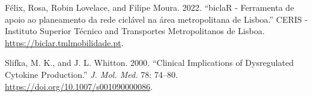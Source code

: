 \documentclass[runningheads]{llncs}
\newlength{\cslhangindent}
\newlength{\cslentryspacingunit} %
\newenvironment{CSLReferences}[2] %
 {%
  \setlength{\parindent}{0pt}
  \ifodd #1
  \let\oldpar\par
  \def\par{\hangindent=\cslhangindent\oldpar}
  \fi
  \setlength{\parskip}{#2\cslentryspacingunit}
 }%
 {}
\begin{document}
\hypertarget{refs}{}
\begin{CSLReferences}{1}{0}
\leavevmode{}%
Félix, Rosa, Robin Lovelace, and Filipe Moura. 2022. {``{biclaR -
Ferramenta de apoio ao planeamento da rede ciclável na área
metropolitana de Lisboa}.''} {CERIS - Instituto Superior Técnico and
Transportes Metropolitanos de Lisboa}.
\url{https://biclar.tmlmobilidade.pt}.

\leavevmode{}%
Slifka, M. K., and J. L. Whitton. 2000. {``Clinical Implications of
Dysregulated Cytokine Production.''} \emph{J. {M}ol. {M}ed.} 78: 74--80.
\url{https://doi.org/10.1007/s001090000086}.

\end{CSLReferences}

%
\end{document}
